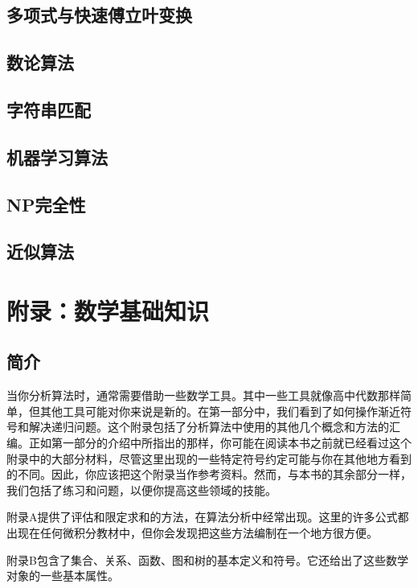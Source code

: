 \documentclass[lang=cn,newtx,10pt,scheme=chinese]{elegantbook}
\begin{document}
\chapter{多项式与快速傅立叶变换}

\chapter{数论算法}

\chapter{字符串匹配}

\chapter{机器学习算法}

\chapter{NP完全性}

\chapter{近似算法}

\part{附录：数学基础知识}

\chapter*{简介}

当你分析算法时，通常需要借助一些数学工具。其中一些工具就像高中代数那样简单，但其他工具可能对你来说是新的。在第一部分中，我们看到了如何操作渐近符号和解决递归问题。这个附录包括了分析算法中使用的其他几个概念和方法的汇编。正如第一部分的介绍中所指出的那样，你可能在阅读本书之前就已经看过这个附录中的大部分材料，尽管这里出现的一些特定符号约定可能与你在其他地方看到的不同。因此，你应该把这个附录当作参考资料。然而，与本书的其余部分一样，我们包括了练习和问题，以便你提高这些领域的技能。

附录A提供了评估和限定求和的方法，在算法分析中经常出现。这里的许多公式都出现在任何微积分教材中，但你会发现把这些方法编制在一个地方很方便。

附录B包含了集合、关系、函数、图和树的基本定义和符号。它还给出了这些数学对象的一些基本属性。
\end{document}
